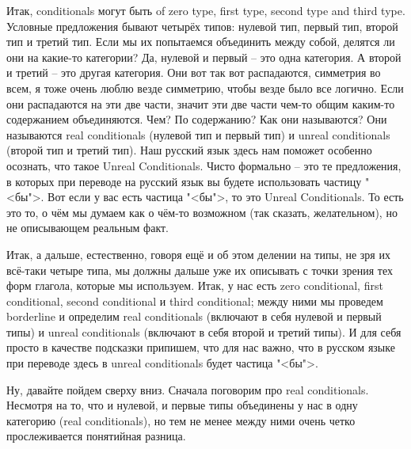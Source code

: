 \documentclass[main.tex]{subfiles}
\begin{document}
Итак, conditionals могут быть of zero type, first type, second type and third type.
Условные предложения бывают четырёх типов: нулевой тип, первый тип, второй тип и третий тип.
Если мы их попытаемся объединить между собой, делятся ли они на какие-то категории?
Да, нулевой и первый -- это одна категория.
А второй и третий -- это другая категория.
Они вот так вот распадаются, симметрия во всем, я тоже очень люблю везде симметрию, чтобы везде было все логично.
Если они распадаются на эти две части, значит эти две части чем-то общим каким-то содержанием объединяются.
Чем?
По содержанию?
Как они называются?
Они называются real conditionals (нулевой тип и первый тип) и unreal conditionals (второй тип и третий тип).
Наш русский язык здесь нам поможет особенно осознать, что такое Unreal Conditionals.
Чисто формально -- это те предложения, в которых при переводе на русский язык вы будете использовать частицу "<бы">.
Вот если у вас есть частица "<бы">, то это Unreal Conditionals.
То есть это то, о чём мы думаем как о чём-то возможном (так сказать, желательном), но не описывающем реальным факт.

Итак, а дальше, естественно, говоря ещё и об этом делении на типы, не зря их всё-таки четыре типа, мы должны дальше уже их описывать с точки зрения тех форм глагола, которые мы используем.
Итак, у нас есть zero conditional, first conditional, second conditional и third conditional; между ними мы проведем borderline и определим real conditionals (включают в себя нулевой и первый типы) и unreal conditionals (включают в себя второй и третий типы).
И для себя просто в качестве подсказки припишем, что для нас важно, что в русском языке при переводе здесь в unreal conditionals будет частица "<бы">.

Ну, давайте пойдем сверху вниз.
Сначала поговорим про real conditionals.
Несмотря на то, что и нулевой, и первые типы объединены у нас в одну категорию (real conditionals), но тем не менее между ними очень четко прослеживается понятийная разница.
\end{document}
